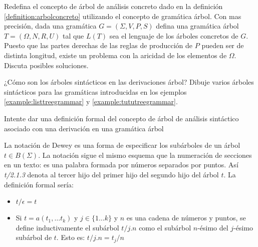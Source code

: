 \begin{exercise}
Redefina el concepto de árbol de análisis concreto dado
en la definición \ref{definition:arbolconcreto} utilizando el
concepto de gramática árbol. Con mas precisión,
dada una gramática $G = (\Sigma, V, P, S)$ defina una gramática
árbol $T = (\Omega, N, R, U)$ tal que $L(T)$ sea el lenguaje 
de los árboles concretos de $G$. Puesto que las partes 
derechas de las reglas de producción de $P$ pueden ser 
de distinta longitud, existe un problema con
la aricidad de los elementos de $\Omega$. Discuta posibles
soluciones.
\end{exercise}

\begin{exercise}
¿Cómo son los árboles sintácticos en las derivaciones árbol?
Dibuje varios árboles sintácticos para las gramáticas 
introducidas en los ejemplos 
\ref{example:listtreegrammar}
y \ref{example:tututreegrammar}.

Intente dar una definición formal del concepto de árbol de análisis
sintáctico asociado con una derivación en una gramática árbol
\end{exercise}

\begin{definition} 
\label{definition:dewey}
La notación de Dewey es una forma de especificar los subárboles
de un árbol $t \in B(\Sigma)$. La notación sigue el mismo
esquema que la numeración de secciones en un texto: 
es una palabra formada por números separados
por puntos. Así {\it t/2.1.3 }
denota al tercer hijo del primer hijo del segundo hijo
del árbol $t$.
La definición formal sería:
\begin{itemize}
\item
$t/\epsilon = t$
\item
Si $t = a(t_1, \ldots t_k)$ y $j \in \{ 1 \ldots k \}$ y $n$ es una 
cadena de números y puntos, se define 
inductivamente el subárbol $t/j.n$ como el subárbol $n$-ésimo del
$j$-ésimo subárbol de $t$. Esto es: $t/j.n = t_j/n$
\end{itemize}
\end{definition}

